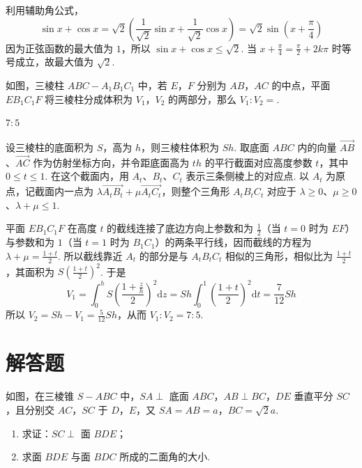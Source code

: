 \begin{solution}
利用辅助角公式，
\[
\sin x+\cos x
=\sqrt{2}\left(\frac{1}{\sqrt{2}}\sin x+\frac{1}{\sqrt{2}}\cos x\right)
=\sqrt{2}\sin\left(x+\frac{\pi}{4}\right)
\]
因为正弦函数的最大值为 \(1\)，所以
\(\sin x+\cos x\leqslant\sqrt{2}\).
当 \(x+\frac{\pi}{4}=\frac{\pi}{2}+2k\pi\) 时等号成立，故最大值为 \(\sqrt{2}\).
\end{solution}

\begin{problem}
如图，三棱柱 \(ABC-A_1B_1C_1\) 中，若 \(E\)，\(F\) 分别为 \(AB\)，\(AC\) 的中点，平面 \(EB_1C_1F\) 将三棱柱分成体积为 \(V_1\)，\(V_2\) 的两部分，那么 \(V_1:V_2=\)\fillinblank{}.

\end{problem}

\begin{answer}
\(7:5\)
\end{answer}

\begin{solution}
设三棱柱的底面积为 \(S\)，高为 \(h\)，则三棱柱体积为 \(Sh\). 取底面 \(ABC\) 内的向量 \(\overrightarrow{AB}\)、\(\overrightarrow{AC}\) 作为仿射坐标方向，并令距底面高为 \(th\) 的平行截面对应高度参数 \(t\)，其中 \(0\leqslant t\leqslant1\). 在这个截面内，用 \(A_t\)、\(B_t\)、\(C_t\) 表示三条侧棱上的对应点. 以 \(A_t\) 为原点，记截面内一点为 \(\lambda\overrightarrow{A_tB_t}+\mu\overrightarrow{A_tC_t}\)，则整个三角形 \(A_tB_tC_t\) 对应于 \(\lambda\geqslant0\)、\(\mu\geqslant0\)、\(\lambda+\mu\leqslant1\).

平面 \(EB_1C_1F\) 在高度 \(t\) 的截线连接了底边方向上参数和为 \(\frac12\)（当 \(t=0\) 时为 \(EF\)）与参数和为 \(1\)（当 \(t=1\) 时为 \(B_1C_1\)）的两条平行线，因而截线的方程为 \(\lambda+\mu=\frac{1+t}{2}\). 所以截线靠近 \(A_t\) 的部分是与 \(A_tB_tC_t\) 相似的三角形，相似比为 \(\frac{1+t}{2}\)，其面积为 \(S\left(\frac{1+t}{2}\right)^2\). 于是
\[
V_1=\int_0^h S\left(\frac{1+\frac{z}{h}}{2}\right)^2\mathrm dz
=Sh\int_0^1\left(\frac{1+t}{2}\right)^2\mathrm dt
=\frac{7}{12}Sh
\]
所以 \(V_2=Sh-V_1=\frac{5}{12}Sh\)，从而 \(V_1:V_2=7:5\).
\end{solution}

\section{解答题}

\begin{problem}
如图，在三棱锥 \(S-ABC\) 中，\(SA\perp\) 底面 \(ABC\)，\(AB\perp BC\)，\(DE\) 垂直平分 \(SC\)，且分别交 \(AC\)，\(SC\) 于 \(D\)，\(E\)，又 \(SA=AB=a\)，\(BC=\sqrt{2}a\).
\begin{enumerate}
\item 求证：\(SC\perp\) 面 \(BDE\)；
\item 求面 \(BDE\) 与面 \(BDC\) 所成的二面角的大小.
\end{enumerate}

\end{problem}

